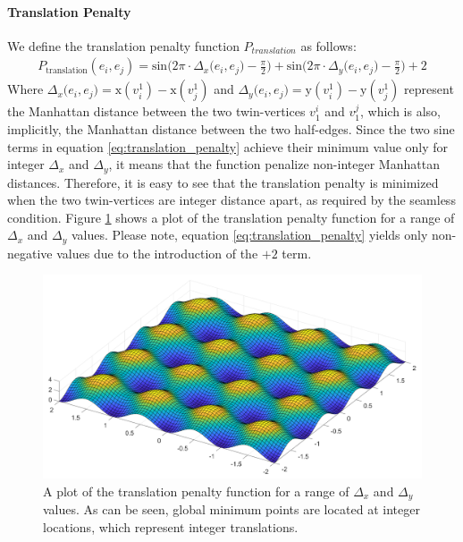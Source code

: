 \paragraph{Translation Penalty}
We define the translation penalty function $P_{translation}$ as follows:
\begin{equation}\label{eq:translation_penalty}
\begin{split}
P_{\mathrm{translation}}\left(e_i,e_j\right) = \mathrm{sin} \Big( 2\pi\cdot\Delta_x\big(e_i,e_j\big) - \frac{\pi}{2}\Big) + \mathrm{sin} \Big( 2\pi\cdot\Delta_y\big(e_i,e_j\big) - \frac{\pi}{2}\Big) + 2
\end{split}
\end{equation}
Where $\Delta_x\big(e_i,e_j\big) = \mathrm{x}\left(v_i^1\right) - \mathrm{x}\left(v_j^1\right)$ and $\Delta_y\big(e_i,e_j\big) = \mathrm{y}\left(v_i^1\right) - \mathrm{y}\left(v_j^1\right)$ represent the Manhattan distance between the two twin-vertices $v^i_1$ and $v^j_1$, which is also, implicitly, the Manhattan distance between the two half-edges. Since the two sine terms in equation \ref{eq:translation_penalty} achieve their minimum value only for integer $\Delta_x$ and $\Delta_y$, it means that the function penalize non-integer Manhattan distances. Therefore, it is easy to see that the translation penalty is minimized when the two twin-vertices are integer distance apart, as required by the seamless condition. Figure \ref{fig:translation_penalty} shows a plot of the translation penalty function for a range of $\Delta_x$ and $\Delta_y$ values. Please note, equation \ref{eq:translation_penalty} yields only non-negative values due to the introduction of the $+2$ term.
\begin{figure}[ht]
\centering
\includegraphics[width=13cm]{figures/seamless/translation_penalty_function.png}
\caption[The Translation Penalty Function]{A plot of the translation penalty function for a range of $\Delta_x$ and $\Delta_y$ values. As can be seen, global minimum points are located at integer locations, which represent integer translations.}
\label{fig:translation_penalty}
\end{figure}
